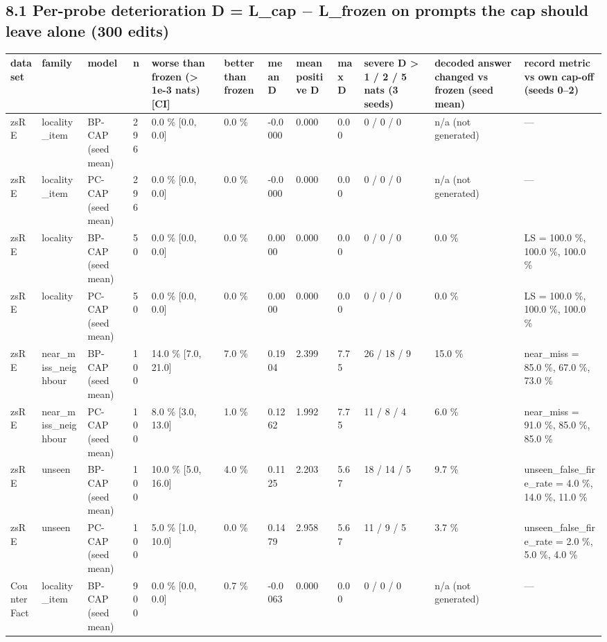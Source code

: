 \documentclass[10pt,a4paper]{article}
\begin{document}
\subsection*{8.1 Per-probe deterioration D = L\_cap $-$ L\_frozen on prompts the cap should leave alone (300 edits)}



\begin{center}\tiny
\begin{tabularx}{\textwidth}{@{}p{}XXXXXXXXXXX@{}}
\toprule
dataset & family & model & n & worse than frozen (> 1e-3 nats) [CI] & better than frozen & mean D & mean positive D & max D & severe D > 1 / 2 / 5 nats (3 seeds) & decoded answer changed vs frozen (seed mean) & record metric vs own cap-off (seeds 0–2) \\ \midrule
zsRE & locality\_item & BP-CAP (seed mean) & 296 & 0.0 \% [0.0, 0.0] & 0.0 \% & -0.0000 & 0.000 & 0.00 & 0 / 0 / 0 & n/a (not generated) & — \\
zsRE & locality\_item & PC-CAP (seed mean) & 296 & 0.0 \% [0.0, 0.0] & 0.0 \% & -0.0000 & 0.000 & 0.00 & 0 / 0 / 0 & n/a (not generated) & — \\
zsRE & locality & BP-CAP (seed mean) & 50 & 0.0 \% [0.0, 0.0] & 0.0 \% & 0.0000 & 0.000 & 0.00 & 0 / 0 / 0 & 0.0 \% & LS = 100.0 \%, 100.0 \%, 100.0 \% \\
zsRE & locality & PC-CAP (seed mean) & 50 & 0.0 \% [0.0, 0.0] & 0.0 \% & 0.0000 & 0.000 & 0.00 & 0 / 0 / 0 & 0.0 \% & LS = 100.0 \%, 100.0 \%, 100.0 \% \\
zsRE & near\_miss\_neighbour & BP-CAP (seed mean) & 100 & 14.0 \% [7.0, 21.0] & 7.0 \% & 0.1904 & 2.399 & 7.75 & 26 / 18 / 9 & 15.0 \% & near\_miss = 85.0 \%, 67.0 \%, 73.0 \% \\
zsRE & near\_miss\_neighbour & PC-CAP (seed mean) & 100 & 8.0 \% [3.0, 13.0] & 1.0 \% & 0.1262 & 1.992 & 7.75 & 11 / 8 / 4 & 6.0 \% & near\_miss = 91.0 \%, 85.0 \%, 85.0 \% \\
zsRE & unseen & BP-CAP (seed mean) & 100 & 10.0 \% [5.0, 16.0] & 4.0 \% & 0.1125 & 2.203 & 5.67 & 18 / 14 / 5 & 9.7 \% & unseen\_false\_fire\_rate = 4.0 \%, 14.0 \%, 11.0 \% \\
zsRE & unseen & PC-CAP (seed mean) & 100 & 5.0 \% [1.0, 10.0] & 0.0 \% & 0.1479 & 2.958 & 5.67 & 11 / 9 / 5 & 3.7 \% & unseen\_false\_fire\_rate = 2.0 \%, 5.0 \%, 4.0 \% \\
CounterFact & locality\_item & BP-CAP (seed mean) & 900 & 0.0 \% [0.0, 0.0] & 0.7 \% & -0.0063 & 0.000 & 0.00 & 0 / 0 / 0 & n/a (not generated) & — \\

\end{tabularx}
\end{center}
\end{document}
